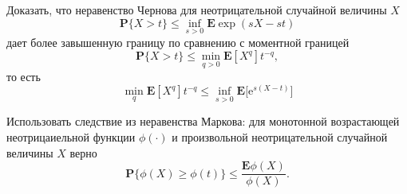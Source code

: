 
\begin{problem}

Доказать, что неравенство Чернова для неотрицательной случайной величины $X$
\begin{equation*}
\mathbf{P}\{ X >t\}\leq \inf_{s>0}\mathbf{E}\exp(sX-st)
\end{equation*}
 дает более завышенную границу по сравнению с моментной границей
\begin{equation*}
\mathbf{P}\{ X >t\}\leq \min_{q>0}\mathbf{E}[X^q]t^{-q},
\end{equation*}
 то есть 
\begin{equation*}
\min_q\mathbf{E}[X^q]t^{-q}\leq \inf_{s>0}\mathbf{E}\big[\text{e}^{s(X-t)}\bigl]
\end{equation*}
\end{problem}

\begin{remark} Использовать следствие из неравенства Маркова: для монотонной возрастающей неотрицаиельной функции $\phi(\cdot)$ и произвольной неотрицательной случайной величины $X$ верно
\begin{equation*}
\mathbf{P}\{\phi(X)\geq \phi(t)\}\leq \frac{\mathbf{E}\phi(X)}{\phi(X)}.
\end{equation*}
\end{remark}



